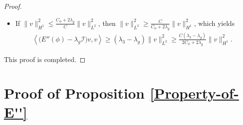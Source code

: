 \documentclass[preprint,3p]{elsarticle}
\begin{document}
\begin{proof}
\begin{itemize}
\begin{align*}
		\end{align*}
		\item If $\|v\|^2_{H^1}\le\frac{C_{\phi}+2\lambda_g}{C}\|v\|^2_{L^2}$, then $\|v\|^2_{L^2}\ge\frac{C}{C_{\phi}+2\lambda_g}\|v\|^2_{H^1}$, which yields
		\begin{align*}
			\left\langle \big(E''(\phi) - \lambda_g \mathcal{I}\big)v, v \right\rangle\ge\left(\lambda_3-\lambda_g\right)\|v\|^2_{L^2}\ge\frac{C(\lambda_3-\lambda_g)}{2C_{\phi}+2\lambda_g}\|v\|^2_{H^1}.
		\end{align*}
	\end{itemize}
	\noindent	This proof is completed.
\end{proof}



\section{Proof of {\bf Proposition }  \ref{Property-of-E''}}\label{Appendix-A}
\end{document}
